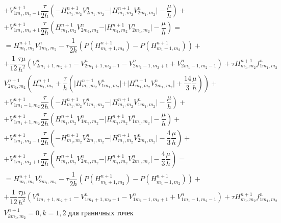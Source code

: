 \documentclass[12pt,a4paper]{article}
\begin{document}
\begin{gather*}
    + V_{1 m_1, m_2 - 1}^{n + 1} \dfrac{\tau}{2h} \left(-H_{m_1, m_2}^{n+1}V_{2 m_1, m_2}^{n} - \vert H_{m_1, m_2}^{n+1}V_{2 m_1, m_2}^{n}\vert - \dfrac{\mu}{h}\right) +\\
    + V_{1 m_1, m_2 + 1}^{n + 1} \dfrac{\tau}{2h} \left(H_{m_1, m_2}^{n+1}V_{2 m_1, m_2}^{n} - \vert H_{m_1, m_2}^{n+1}V_{2 m_1, m_2}^{n}\vert - \dfrac{\mu}{h}\right) =\\
    = H_{m_1, m_2}^{n+1}V_{1 m_1, m_2}^{n} - \tau \dfrac{1}{2h}(P(H_{m_1 + 1, m_2}^{n+1}) - P(H_{m_1 - 1, m_2}^{n+1})) +\\
    +\dfrac{1}{12} \dfrac{\tau\mu}{h^2} ( V_{2 m_1 + 1, m_2 + 1}^{n} - V_{2 m_1 + 1, m_2 + 1}^{n} - V_{2 m_1 - 1, m_2 + 1}^{n} + V_{2 m_1 - 1, m_2 - 1}^{n} ) + \tau H_{m_1, m_2}^{n+1}f_{1 m_1, m_2}^{n}\\
    V_{2 m_1, m_2}^{n+1} \left(H_{m_1, m_2}^{n+1} + \dfrac{\tau}{h} \left( \vert H_{m_1, m_2}^{n+1} V_{1 m_1, m_2}^{n} \vert  + \vert H_{m_1, m_2}^{n+1} V_{2 m_1, m_2}^{n} \vert + \dfrac{14}{3} \dfrac{\mu}{h} \right) \right) +\\
    + V_{1 m_1 - 1, m_2}^{n + 1} \dfrac{\tau}{2h} \left(-H_{m_1, m_2}^{n+1}V_{1 m_1, m_2}^{n} - \vert H_{m_1, m_2}^{n+1}V_{1 m_1, m_2}^{n}\vert - \dfrac{\mu}{h}\right) +\\
    + V_{1 m_1 + 1, m_2}^{n + 1} \dfrac{\tau}{2h} \left(H_{m_1, m_2}^{n+1}V_{1 m_1, m_2}^{n} - \vert H_{m_1, m_2}^{n+1}V_{1 m_1, m_2}^{n}\vert - \dfrac{\mu}{h}\right) +\\
    + V_{1 m_1, m_2 - 1}^{n + 1} \dfrac{\tau}{2h} \left(-H_{m_1, m_2}^{n+1}V_{2 m_1, m_2}^{n} - \vert H_{m_1, m_2}^{n+1}V_{2 m_1, m_2}^{n}\vert - \dfrac43 \dfrac{\mu}{h}\right) +\\
    + V_{1 m_1, m_2 + 1}^{n + 1} \dfrac{\tau}{2h} \left(H_{m_1, m_2}^{n+1}V_{2 m_1, m_2}^{n} - \vert H_{m_1, m_2}^{n+1}V_{2 m_1, m_2}^{n}\vert - \dfrac43 \dfrac{\mu}{h}\right) =\\
    = H_{m_1, m_2}^{n+1}V_{2 m_1, m_2}^{n} - \tau \dfrac{1}{2h}(P(H_{m_1 + 1, m_2}^{n+1}) - P(H_{m_1 - 1, m_2}^{n+1})) +\\
    +\dfrac{1}{12} \dfrac{\tau\mu}{h^2} ( V_{1 m_1 + 1, m_2 + 1}^{n} - V_{1 m_1 + 1, m_2 + 1}^{n} - V_{1 m_1 - 1, m_2 + 1}^{n} + V_{1 m_1 - 1, m_2 - 1}^{n} ) + \tau H_{m_1, m_2}^{n+1}f_{1 m_1, m_2}^{n}\\
    V_{km_1, m_2}^{n+1} = 0, k = 1,2 \text{ для граничных точек}
\end{gather*}
%
%
%
%
%
%
%
\end{document}
